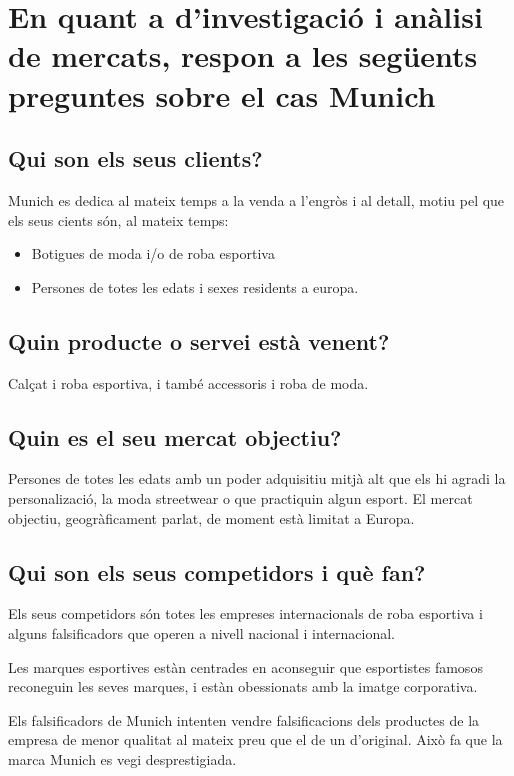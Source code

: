 \section{ En quant a d’investigació i anàlisi de mercats, respon a les següents 
preguntes sobre el cas Munich }

\subsection{ Qui son els seus clients? }

Munich es dedica al mateix temps a la venda a l'engròs i al detall, motiu pel
que els seus cients són, al mateix temps:

\begin{itemize}
  \item Botigues de moda i/o de roba esportiva
  \item Persones de totes les edats i sexes residents a europa.
\end{itemize}

\subsection{ Quin producte o servei està venent? }

Calçat i roba esportiva, i també accessoris i roba de moda.

\subsection{ Quin es el seu mercat objectiu? }

Persones de totes les edats amb un poder adquisitiu mitjà alt que els hi agradi
la personalizació, la moda streetwear o que practiquin algun esport. El mercat
objectiu, geogràficament parlat, de moment està limitat a Europa.

\subsection{ Qui son els seus competidors i què fan? }

Els seus competidors són totes les empreses internacionals de roba esportiva i
alguns falsificadors que operen a nivell nacional i internacional.

Les marques esportives estàn centrades en aconseguir que esportistes famosos
reconeguin les seves marques, i estàn obessionats amb la imatge corporativa.

Els falsificadors de Munich intenten vendre falsificacions dels productes de la
empresa de menor qualitat al mateix preu que el de un d'original.
Això fa que la marca Munich es vegi desprestigiada.
